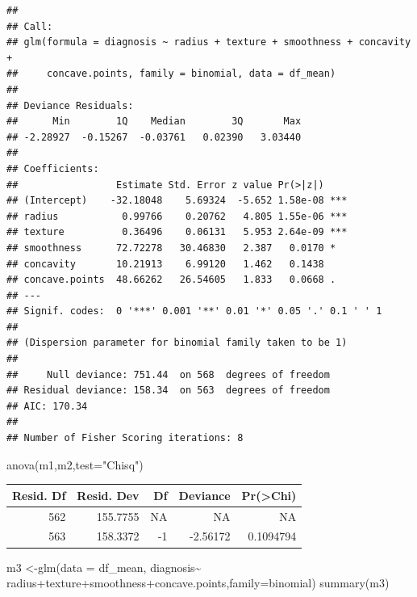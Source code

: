 \documentclass[
  11pt,
]{article}
\newenvironment{Shaded}{\begin{snugshade}}{\end{snugshade}}
\newcommand{\AttributeTok}[1]{\textcolor[rgb]{0.77,0.63,0.00}{#1}}
\newcommand{\FunctionTok}[1]{\textcolor[rgb]{0.00,0.00,0.00}{#1}}
\newcommand{\NormalTok}[1]{#1}
\newcommand{\OtherTok}[1]{\textcolor[rgb]{0.56,0.35,0.01}{#1}}
\newcommand{\SpecialCharTok}[1]{\textcolor[rgb]{0.00,0.00,0.00}{#1}}
\newcommand{\StringTok}[1]{\textcolor[rgb]{0.31,0.60,0.02}{#1}}
\begin{document}
\begin{verbatim}
## 
## Call:
## glm(formula = diagnosis ~ radius + texture + smoothness + concavity + 
##     concave.points, family = binomial, data = df_mean)
## 
## Deviance Residuals: 
##      Min        1Q    Median        3Q       Max  
## -2.28927  -0.15267  -0.03761   0.02390   3.03440  
## 
## Coefficients:
##                 Estimate Std. Error z value Pr(>|z|)    
## (Intercept)    -32.18048    5.69324  -5.652 1.58e-08 ***
## radius           0.99766    0.20762   4.805 1.55e-06 ***
## texture          0.36496    0.06131   5.953 2.64e-09 ***
## smoothness      72.72278   30.46830   2.387   0.0170 *  
## concavity       10.21913    6.99120   1.462   0.1438    
## concave.points  48.66262   26.54605   1.833   0.0668 .  
## ---
## Signif. codes:  0 '***' 0.001 '**' 0.01 '*' 0.05 '.' 0.1 ' ' 1
## 
## (Dispersion parameter for binomial family taken to be 1)
## 
##     Null deviance: 751.44  on 568  degrees of freedom
## Residual deviance: 158.34  on 563  degrees of freedom
## AIC: 170.34
## 
## Number of Fisher Scoring iterations: 8
\end{verbatim}

\begin{Shaded}
\begin{Highlighting}[]
\FunctionTok{anova}\NormalTok{(m1,m2,}\AttributeTok{test=}\StringTok{"Chisq"}\NormalTok{)}
\end{Highlighting}
\end{Shaded}

\begin{tabular}{r|r|r|r|r}
\hline
Resid. Df & Resid. Dev & Df & Deviance & Pr(>Chi)\\
\hline
562 & 155.7755 & NA & NA & NA\\
\hline
563 & 158.3372 & -1 & -2.56172 & 0.1094794\\
\hline
\end{tabular}

\begin{Shaded}
\begin{Highlighting}[]
\NormalTok{m3 }\OtherTok{\textless{}{-}}\FunctionTok{glm}\NormalTok{(}\AttributeTok{data =}\NormalTok{ df\_mean, diagnosis}\SpecialCharTok{\textasciitilde{}}\NormalTok{ radius}\SpecialCharTok{+}\NormalTok{texture}\SpecialCharTok{+}\NormalTok{smoothness}\SpecialCharTok{+}\NormalTok{concave.points,}\AttributeTok{family=}\NormalTok{binomial)}
\FunctionTok{summary}\NormalTok{(m3)}
\end{Highlighting}
\end{Shaded}
\end{document}
